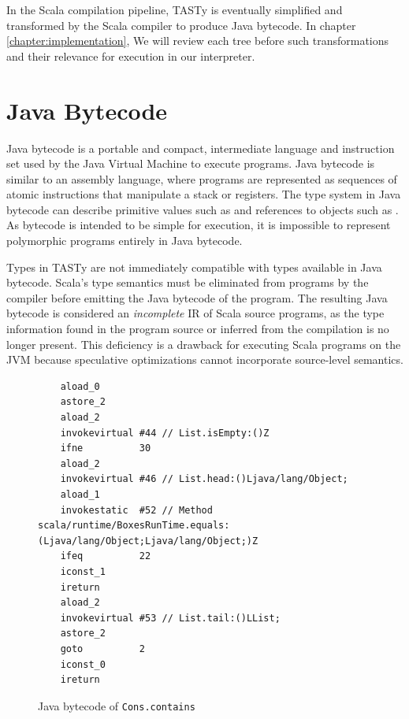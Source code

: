 In the Scala compilation pipeline, TASTy is eventually simplified and transformed by the Scala compiler to produce Java bytecode. 
In chapter \ref{chapter:implementation}, We will review each tree before such transformations and their relevance for execution in our interpreter.

\section{Java Bytecode}

Java bytecode is a portable and compact, intermediate language and instruction set used by the Java Virtual Machine to execute programs.
Java bytecode is similar to an assembly language, where programs are represented as sequences of atomic instructions that manipulate a stack or registers.
The type system in Java bytecode can describe primitive values such as  and references to objects such as .
As bytecode is intended to be simple for execution, it is impossible to represent polymorphic programs entirely in Java bytecode.

Types in TASTy are not immediately compatible with types available in Java bytecode.
Scala's type semantics must be eliminated from programs by the compiler before emitting the Java bytecode of the program.
The resulting Java bytecode is considered an \textit{incomplete} IR of Scala source programs, as the type information found in the program source or inferred from the compilation is no longer present.
This deficiency is a drawback for executing Scala programs on the JVM because speculative optimizations cannot incorporate source-level semantics.

\begin{figure}[!htb]
	\begin{verbatim}
	aload_0
 	astore_2
	aload_2
	invokevirtual #44 // List.isEmpty:()Z
	ifne          30
	aload_2
	invokevirtual #46 // List.head:()Ljava/lang/Object;
	aload_1
	invokestatic  #52 // Method scala/runtime/BoxesRunTime.equals:(Ljava/lang/Object;Ljava/lang/Object;)Z
	ifeq          22
	iconst_1
	ireturn
	aload_2
	invokevirtual #53 // List.tail:()LList;
	astore_2
	goto          2
	iconst_0
	ireturn
	\end{verbatim}
	\caption{Java bytecode of \texttt{Cons.contains}}
	\label{example:contains-bytecode}
\end{figure}

